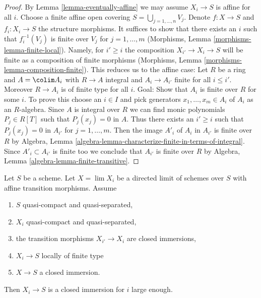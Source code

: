 \begin{proof}
By Lemma \ref{lemma-eventually-affine}
we may assume $X_i \to S$ is affine for all $i$.
Choose a finite affine open covering $S = \bigcup_{j = 1, \ldots, n} V_j$.
Denote $f : X \to S$ and $f_i : X_i \to S$ the structure morphisms.
It suffices to show that there exists an $i$ such that
$f_i^{-1}(V_j)$ is finite over $V_j$ for $j = 1, \ldots, m$
(Morphisms, Lemma \ref{morphisms-lemma-finite-local}).
Namely, for $i' \geq i$ the composition $X_{i'} \to X_i \to S$
will be finite as a composition of finite morphisms
(Morphisms, Lemma \ref{morphisms-lemma-composition-finite}).
This reduces us to the affine case: Let $R$ be a ring and
$A = \colim A_i$ with $R \to A$ integral and $A_i \to A_{i'}$
finite for all $i \leq i'$. Moreover $R \to A_i$ is of finite type
for all $i$. Goal: Show that $A_i$ is finite over $R$ for some $i$.
To prove this choose an $i \in I$ and pick generators
$x_1, \ldots, x_m \in A_i$ of $A_i$ as an $R$-algebra.
Since $A$ is integral over $R$ we can find monic polynomials
$P_j \in R[T]$ such that $P_j(x_j) = 0$ in $A$.
Thus there exists an $i' \geq i$ such that $P_j(x_j) = 0$ in $A_{i'}$
for $j = 1, \ldots, m$. Then the image $A'_i$ of $A_i$ in $A_{i'}$
is finite over $R$ by
Algebra, Lemma \ref{algebra-lemma-characterize-finite-in-terms-of-integral}.
Since $A'_i \subset A_{i'}$ is finite too we conclude
that $A_{i'}$ is finite over $R$ by
Algebra, Lemma \ref{algebra-lemma-finite-transitive}.
\end{proof}

\begin{lemma}
\label{lemma-eventually-closed-immersion}
Let $S$ be a scheme. Let $X = \lim X_i$ be a directed limit of schemes
over $S$ with affine transition morphisms. Assume
\begin{enumerate}
\item $S$ quasi-compact and quasi-separated,
\item $X_i$ quasi-compact and quasi-separated,
\item the transition morphisms $X_{i'} \to X_i$ are closed immersions,
\item $X_i \to S$ locally of finite type
\item $X \to S$ a closed immersion.
\end{enumerate}
Then $X_i \to S$ is a closed immersion for $i$ large enough.
\end{lemma}

